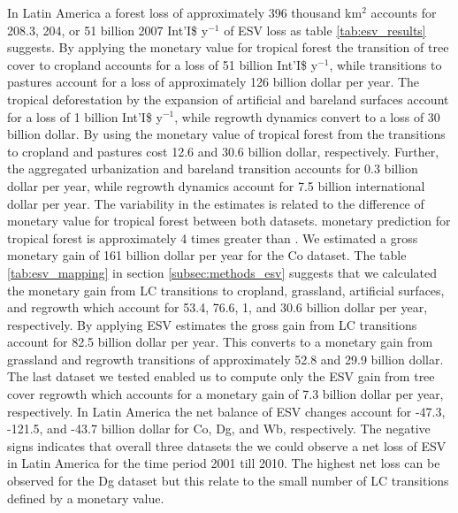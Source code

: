 		In Latin America a forest loss of approximately 396 thousand km$^2$ accounts for 208.3, 204, or 51 billion 2007 Int'I\$ y$^{-1}$ of \ac{ESV} loss as table \ref{tab:esv_results} suggests. By applying the \citet{Costanza2014} monetary value for tropical forest the transition of tree cover to cropland accounts for a loss of 51 billion Int'I\$ y$^{-1}$, while transitions to pastures account for a loss of approximately 126 billion dollar per year. The tropical deforestation by the expansion of artificial and bareland surfaces account for a loss of 1 billion Int'I\$ y$^{-1}$, while regrowth dynamics convert to a loss of 30 billion dollar. By using the monetary value of tropical forest from \citet{Siikamaki2015} the transitions to cropland and pastures cost 12.6 and 30.6 billion dollar, respectively. Further, the aggregated urbanization and bareland transition accounts for 0.3 billion dollar per year, while regrowth dynamics account for 7.5 billion international dollar per year. The variability in the estimates is related to the difference of monetary value for tropical forest between both datasets. \citeauthor{Costanza2014} monetary prediction for tropical forest is approximately 4 times greater than \citeauthor{Siikamaki2015}. We estimated a gross monetary gain of 161 billion dollar per year for the Co dataset. The table \ref{tab:esv_mapping} in section \ref{subsec:methods_esv} suggests that we calculated the monetary gain from \ac{LC} transitions to cropland, grassland, artificial surfaces, and regrowth which account for 53.4, 76.6, 1, and 30.6 billion dollar per year, respectively. By applying \citet{Groot2012} \ac{ESV} estimates the gross gain from \ac{LC} transitions account for 82.5 billion dollar per year. This converts to a monetary gain from grassland and regrowth transitions of approximately 52.8 and 29.9 billion dollar. The last dataset we tested enabled us to compute only the \ac{ESV} gain from tree cover regrowth which accounts for a monetary gain of 7.3 billion dollar per year, respectively. In Latin America the net balance of \ac{ESV} changes account for -47.3, -121.5, and -43.7 billion dollar for Co, Dg, and Wb, respectively. The negative signs indicates that overall three datasets the we could observe a net loss of \ac{ESV} in Latin America for the time period 2001 till 2010. The highest net loss can be observed for the Dg dataset but this relate to the small number of \ac{LC} transitions defined by a monetary value.
